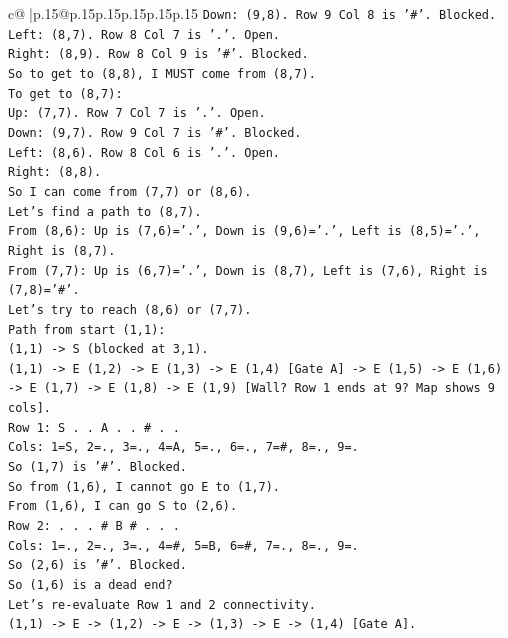 \documentclass{article}
\begin{document}
{\begin{supertabular}{c@{$\;$}|p{.15\linewidth}@{}p{.15\linewidth}p{.15\linewidth}p{.15\linewidth}p{.15\linewidth}p{.15\linewidth}}
{{{\texttt{Down: (9,8). Row 9 Col 8 is '\#'. Blocked.} \\
\texttt{Left: (8,7). Row 8 Col 7 is '.'. Open.} \\
\texttt{Right: (8,9). Row 8 Col 9 is '\#'. Blocked.} \\
\texttt{So to get to (8,8), I MUST come from (8,7).} \\
\texttt{To get to (8,7):} \\
\texttt{Up: (7,7). Row 7 Col 7 is '.'. Open.} \\
\texttt{Down: (9,7). Row 9 Col 7 is '\#'. Blocked.} \\
\texttt{Left: (8,6). Row 8 Col 6 is '.'. Open.} \\
\texttt{Right: (8,8).} \\
\texttt{So I can come from (7,7) or (8,6).} \\
\texttt{Let's find a path to (8,7).} \\
\texttt{From (8,6): Up is (7,6)='.', Down is (9,6)='.', Left is (8,5)='.', Right is (8,7).} \\
\texttt{From (7,7): Up is (6,7)='.', Down is (8,7), Left is (7,6), Right is (7,8)='\#'.} \\
\texttt{Let's try to reach (8,6) or (7,7).} \\
\texttt{Path from start (1,1):} \\
\texttt{(1,1) {-}> S (blocked at 3,1).} \\
\texttt{(1,1) {-}> E (1,2) {-}> E (1,3) {-}> E (1,4) {[}Gate A{]} {-}> E (1,5) {-}> E (1,6) {-}> E (1,7) {-}> E (1,8) {-}> E (1,9) {[}Wall? Row 1 ends at 9? Map shows 9 cols{]}.} \\
\texttt{Row 1: S . . A . . \# . .} \\
\texttt{Cols: 1=S, 2=., 3=., 4=A, 5=., 6=., 7=\#, 8=., 9=.} \\
\texttt{So (1,7) is '\#'. Blocked.} \\
\texttt{So from (1,6), I cannot go E to (1,7).} \\
\texttt{From (1,6), I can go S to (2,6).} \\
\texttt{Row 2: . . . \# B \# . . .} \\
\texttt{Cols: 1=., 2=., 3=., 4=\#, 5=B, 6=\#, 7=., 8=., 9=.} \\
\texttt{So (2,6) is '\#'. Blocked.} \\
\texttt{So (1,6) is a dead end?} \\
\texttt{Let's re{-}evaluate Row 1 and 2 connectivity.} \\
\texttt{(1,1) {-}> E {-}> (1,2) {-}> E {-}> (1,3) {-}> E {-}> (1,4) {[}Gate A{]}.} \\
}}}
\end{supertabular}}
\end{document}
